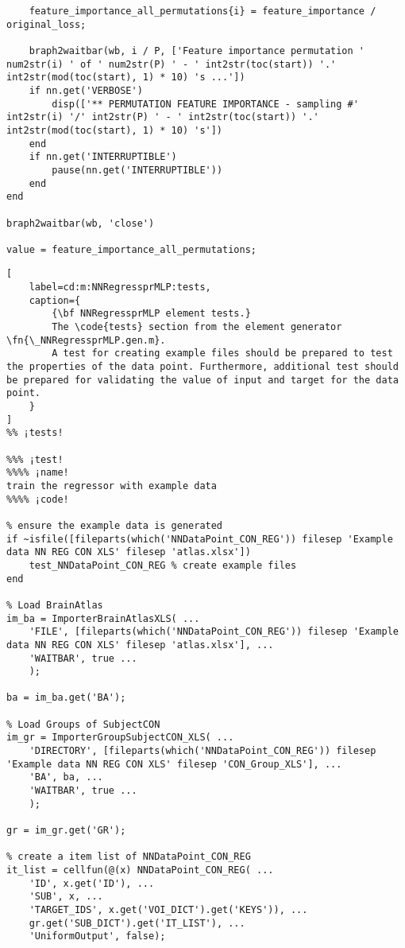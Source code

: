 \documentclass{tufte-handout}
\begin{document}
\begin{lstlisting}
    feature_importance_all_permutations{i} = feature_importance / original_loss;

    braph2waitbar(wb, i / P, ['Feature importance permutation ' num2str(i) ' of ' num2str(P) ' - ' int2str(toc(start)) '.' int2str(mod(toc(start), 1) * 10) 's ...'])
    if nn.get('VERBOSE')
        disp(['** PERMUTATION FEATURE IMPORTANCE - sampling #' int2str(i) '/' int2str(P) ' - ' int2str(toc(start)) '.' int2str(mod(toc(start), 1) * 10) 's'])
    end
    if nn.get('INTERRUPTIBLE')
        pause(nn.get('INTERRUPTIBLE'))
    end
end

braph2waitbar(wb, 'close')

value = feature_importance_all_permutations;
\end{lstlisting}

\clearpage

\begin{lstlisting}[
	label=cd:m:NNRegressprMLP:tests,
	caption={
		{\bf NNRegressprMLP element tests.}
		The \code{tests} section from the element generator \fn{\_NNRegressprMLP.gen.m}.
		A test for creating example files should be prepared to test the properties of the data point. Furthermore, additional test should be prepared for validating the value of input and target for the data point.
	}
]			
%% ¡tests!

%%% ¡test!
%%%% ¡name!
train the regressor with example data
%%%% ¡code!

% ensure the example data is generated
if ~isfile([fileparts(which('NNDataPoint_CON_REG')) filesep 'Example data NN REG CON XLS' filesep 'atlas.xlsx'])
    test_NNDataPoint_CON_REG % create example files
end

% Load BrainAtlas
im_ba = ImporterBrainAtlasXLS( ...
    'FILE', [fileparts(which('NNDataPoint_CON_REG')) filesep 'Example data NN REG CON XLS' filesep 'atlas.xlsx'], ...
    'WAITBAR', true ...
    );

ba = im_ba.get('BA');

% Load Groups of SubjectCON
im_gr = ImporterGroupSubjectCON_XLS( ...
    'DIRECTORY', [fileparts(which('NNDataPoint_CON_REG')) filesep 'Example data NN REG CON XLS' filesep 'CON_Group_XLS'], ...
    'BA', ba, ...
    'WAITBAR', true ...
    );

gr = im_gr.get('GR');

% create a item list of NNDataPoint_CON_REG
it_list = cellfun(@(x) NNDataPoint_CON_REG( ...
    'ID', x.get('ID'), ...
    'SUB', x, ...
    'TARGET_IDS', x.get('VOI_DICT').get('KEYS')), ...
    gr.get('SUB_DICT').get('IT_LIST'), ...
    'UniformOutput', false);


\end{lstlisting}
\end{document}
